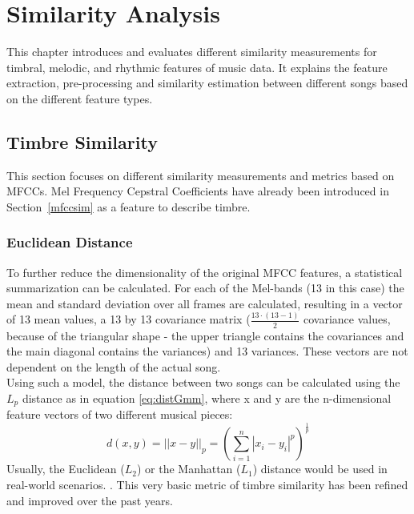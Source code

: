 
\chapter{Similarity Analysis}\label{simanal}


This chapter introduces and evaluates different similarity measurements for timbral, melodic, and rhythmic features of music data. It explains the feature extraction, pre-processing and similarity estimation between different songs based on the different feature types. 

\section{Timbre Similarity} \label{musly}

This section focuses on different similarity measurements and metrics based on MFCCs. Mel Frequency Cepstral Coefficients have already been introduced in Section~\ref{mfccsim} as a feature to describe timbre.\\

\subsection{Euclidean Distance}\label{mfcceuc}

To further reduce the dimensionality of the original MFCC features, a statistical summarization can be calculated. For each of the Mel-bands (13 in this case) the mean and standard deviation over all frames are calculated, resulting in a vector of 13 mean values, a 13 by 13 covariance matrix ($\frac{13\cdot(13-1)}{2}$ covariance values, because of the triangular shape - the upper triangle contains the covariances and the main diagonal contains the variances) and 13 variances. These vectors are not dependent on the length of the actual song. \cite[pp. 51ff]{knees1}\\
Using such a model, the distance between two songs can be calculated using the $L_p$ distance as in equation \eqref{eq:distGmm}, where x and y are the n-dimensional feature vectors of two different musical pieces:
\begin{equation} \label{eq:distGmm}
d(x, y) = ||x - y||_p = \left(\sum_{i=1}^{n}{|x_i - y_i|^p}\right)^{\frac{1}{p}}
\end{equation}
Usually, the Euclidean ($L_2$) or the Manhattan ($L_1$) distance would be used in real-world scenarios. \cite[p. 58]{knees1}. This very basic metric of timbre similarity has been refined and improved over the past years.

